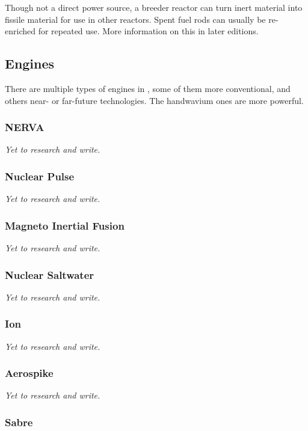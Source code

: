 Though not a direct power source, a breeder reactor can turn inert material into fissile material for use in other reactors. Spent fuel rods can usually be re-enriched for repeated use. More information on this in later editions.

\subsection{Engines}

There are multiple types of engines in \getTitle , some of them more conventional, and others near- or far-future technologies. The handwavium ones are more powerful.

\subsubsection{NERVA}

\textit{Yet to research and write.}

\subsubsection{Nuclear Pulse}

\textit{Yet to research and write.}

\subsubsection{Magneto Inertial Fusion}

\textit{Yet to research and write.}

\subsubsection{Nuclear Saltwater}

\textit{Yet to research and write.}

\subsubsection{Ion}

\textit{Yet to research and write.}

\subsubsection{Aerospike}

\textit{Yet to research and write.}

\subsubsection{Sabre}

